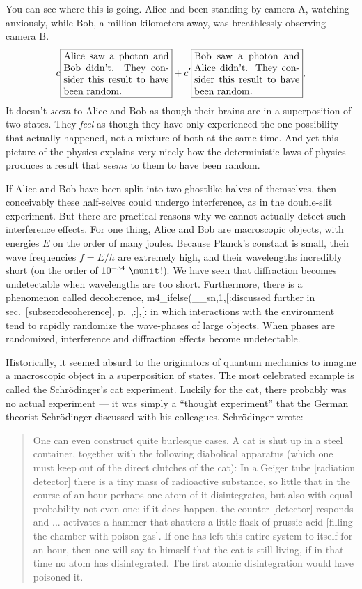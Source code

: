 You can see where this is going.  Alice had been standing by camera A,
watching anxiously, while Bob, a million kilometers away, was
breathlessly observing camera B. 
\begin{equation*}
 c\fbox{\parbox{38mm}{Alice saw a photon and Bob didn't. They consider this result to have been random.}}
+c'\fbox{\parbox{38mm}{Bob saw a photon and Alice didn't. They consider this result to have been random.}},
\end{equation*}
It doesn't \emph{seem} to Alice and Bob as though their brains are in
a superposition of two states. They \emph{feel} as though they have only
experienced the one possibility that actually happened, not a mixture of
both at the same time. And yet this picture of the physics explains very nicely
how the deterministic laws of physics produces a result that \emph{seems}
to them to have been random.

If Alice and Bob have been split into two ghostlike halves of
themselves, then conceivably these half-selves could undergo
interference, as in the double-slit experiment. But there are
practical reasons why we cannot actually detect such interference
effects. For one thing, Alice and Bob are macroscopic objects, with
energies $E$ on the order of many joules. Because Planck's constant is
small, their wave frequencies $f=E/h$ are extremely high, and their
wavelengths incredibly short (on the order of $10^{-34}\ \munit$!). We
have seen that diffraction becomes undetectable when wavelengths are
too short.  Furthermore, there is a phenomenon called decoherence,\label{decoherence-brief}
m4_ifelse(__sn,1,[:discussed further in sec.~\ref{subsec:decoherence}, p.~\pageref{subsec:decoherence},:],[:%
in which interactions with the environment tend to rapidly randomize
the wave-phases of large objects. When phases are randomized,
interference and diffraction effects become undetectable. 

Historically, it seemed absurd to the originators of quantum mechanics
to imagine a macroscopic object in a superposition of states.
The most celebrated example is called the Schr\"odinger's cat\label{schrodingers-cat}
experiment. Luckily for the cat, there probably was no
actual experiment --- it was simply a ``thought experiment''
that the German theorist Schr\"odinger discussed
with his colleagues. Schr\"odinger wrote:

\begin{quote}
One can even construct quite burlesque cases. A cat is shut
up in a steel container, together with the following
diabolical apparatus (which one must keep out of the direct
clutches of the cat): In a Geiger tube [radiation detector]
there is a tiny mass of radioactive substance, so little
that in the course of an hour perhaps one atom of it
disintegrates, but also with equal probability not even one;
if it does happen, the counter [detector] responds and ...
activates a hammer that shatters a little flask of prussic
acid [filling the chamber with poison gas]. If one has left
this entire system to itself for an hour, then one will say
to himself that the cat is still living, if in that time no
atom has disintegrated. The first atomic disintegration
would have poisoned it.
\end{quote}

